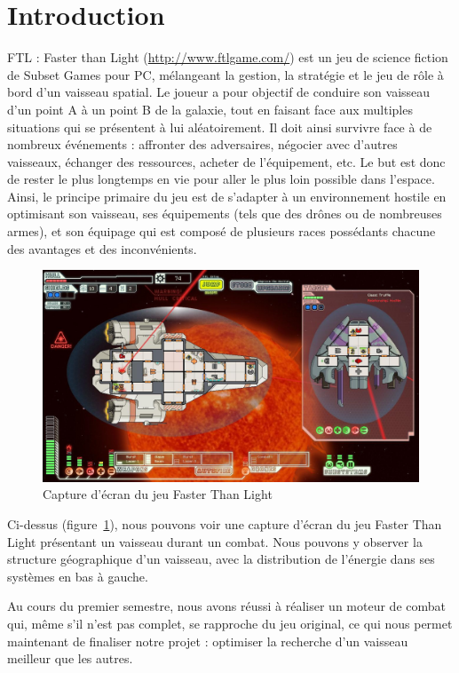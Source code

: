 	\chapter*{Introduction}
	
	FTL : Faster than Light (\url{http://www.ftlgame.com/}) est un jeu de science fiction de Subset Games pour PC, mélangeant la gestion, la stratégie et le jeu de rôle à bord d'un vaisseau spatial. Le joueur a pour objectif de conduire son vaisseau d'un point A à un point B de la galaxie, tout en faisant face aux multiples situations qui se présentent à lui aléatoirement. Il doit ainsi survivre face à de nombreux événements : affronter des adversaires, négocier avec d'autres vaisseaux, échanger des ressources, acheter de l'équipement, etc. Le but est donc de rester le plus longtemps en vie pour aller le plus loin possible dans l'espace. Ainsi, le principe primaire du jeu est de s'adapter à un environnement hostile en optimisant son vaisseau, ses équipements (tels que des drônes ou de nombreuses armes), et son équipage qui est composé de plusieurs races possédants chacune des avantages et des inconvénients.
	\begin{figure}[H]
		\caption{Capture d'écran du jeu Faster Than Light}
		\label{fig:screen}
		\centering
		\includegraphics[width=1\linewidth]{screen.jpg}
	\end{figure}
	Ci-dessus (figure~\ref{fig:screen}), nous pouvons voir une capture d'écran du jeu Faster Than Light présentant un vaisseau durant un combat. Nous pouvons y observer la structure géographique d'un vaisseau, avec la distribution de l'énergie dans ses systèmes en bas à gauche.
	
	
	Au cours du premier semestre, nous avons réussi à réaliser un moteur de combat qui, même s'il n'est pas complet, se rapproche du jeu original, ce qui nous permet maintenant de finaliser notre projet : optimiser la recherche d'un vaisseau meilleur que les autres.
	
